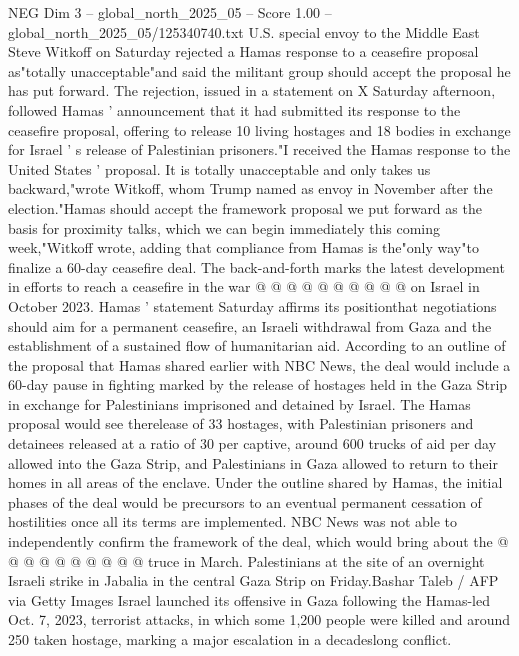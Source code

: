 \begin{textsample}{NEG Dim 3 – global\_north\_2025\_05 – Score 1.00 – global\_north\_2025\_05/125340740.txt}  \label{ex:f3_neg_329}
U.S. special envoy to the Middle East Steve Witkoff on Saturday rejected a Hamas response to a ceasefire proposal as"totally unacceptable"and said the militant group should accept the proposal he has put forward.
The rejection, issued in a statement on X Saturday afternoon, followed Hamas ' announcement that it had submitted its response to the ceasefire proposal, offering to release 10 living hostages and 18 bodies in exchange for Israel ' s release of Palestinian prisoners."I received the Hamas response to the United States ' proposal.
It is totally unacceptable and only takes us backward,"wrote Witkoff, whom Trump named as envoy in November after the election."Hamas should accept the framework proposal we put forward as the basis for proximity talks, which we can begin immediately this coming week,"Witkoff wrote, adding that compliance from Hamas is the"only way"to finalize a 60-day ceasefire deal.
The back-and-forth marks the latest development in efforts to reach a ceasefire in the war @ @ @ @ @ @ @ @ @ @ on Israel in October 2023.
Hamas ' statement Saturday affirms its positionthat negotiations should aim for a permanent ceasefire, an Israeli withdrawal from Gaza and the establishment of a sustained flow of humanitarian aid.
According to an outline of the proposal that Hamas shared earlier with NBC News, the deal would include a 60-day pause in fighting marked by the release of hostages held in the Gaza Strip in exchange for Palestinians imprisoned and detained by Israel.
The Hamas proposal would see therelease of 33 hostages, with Palestinian prisoners and detainees released at a ratio of 30 per captive, around 600 trucks of aid per day allowed into the Gaza Strip, and Palestinians in Gaza allowed to return to their homes in all areas of the enclave.
Under the outline shared by Hamas, the initial phases of the deal would be precursors to an eventual permanent cessation of hostilities once all its terms are implemented.
NBC News was not able to independently confirm the framework of the deal, which would bring about the @ @ @ @ @ @ @ @ @ @ truce in March.
Palestinians at the site of an overnight Israeli strike in Jabalia in the central Gaza Strip on Friday.Bashar Taleb / AFP via Getty Images Israel launched its offensive in Gaza following the Hamas-led Oct. 7, 2023, terrorist attacks, in which some 1,200 people were killed and around 250 taken hostage, marking a major escalation in a decadeslong conflict.

\end{textsample}
